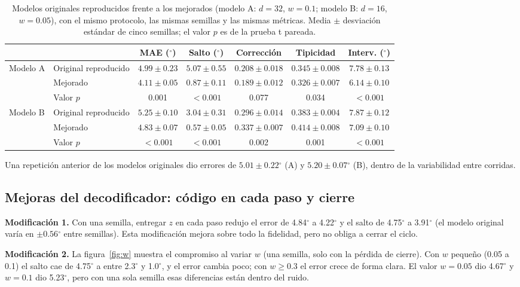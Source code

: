 \documentclass[11pt,a4paper]{amsart}
\newcommand{\gr}{$^{\circ}$}
\begin{document}
\begin{table}[h]
\centering\small
\setlength{\tabcolsep}{3pt}
\begin{tabular}{llccccc}
\toprule
 & & MAE (\gr) & Salto (\gr) & Corrección & Tipicidad & Interv. (\gr) \\
\midrule
\multirow{3}{*}{Modelo A} & Original reproducido & $4.99\pm0.23$ & $5.07\pm0.55$ & $0.208\pm0.018$ & $0.345\pm0.008$ & $7.78\pm0.13$ \\
 & Mejorado & $4.11\pm0.05$ & $0.87\pm0.11$ & $0.189\pm0.012$ & $0.326\pm0.007$ & $6.14\pm0.10$ \\
 & Valor $p$ & 0.001 & $<0.001$ & 0.077 & 0.034 & $<0.001$ \\
\midrule
\multirow{3}{*}{Modelo B} & Original reproducido & $5.25\pm0.10$ & $3.04\pm0.31$ & $0.296\pm0.014$ & $0.383\pm0.004$ & $7.87\pm0.12$ \\
 & Mejorado & $4.83\pm0.07$ & $0.57\pm0.05$ & $0.337\pm0.007$ & $0.414\pm0.008$ & $7.09\pm0.10$ \\
 & Valor $p$ & $<0.001$ & $<0.001$ & 0.002 & 0.001 & $<0.001$ \\
\bottomrule
\end{tabular}
\caption{Modelos originales reproducidos frente a los mejorados (modelo A: $d=32$, $w=0.1$; modelo B: $d=16$, $w=0.05$), con el mismo protocolo, las mismas semillas y las mismas métricas. Media $\pm$ desviación estándar de cinco semillas; el valor $p$ es de la prueba t pareada.}
\label{tab:origrep}
\end{table}

Una repetición anterior de los modelos originales dio errores de $5.01\pm0.22$\gr{} (A) y $5.20\pm0.07$\gr{} (B), dentro de la variabilidad entre corridas.

\subsection{Mejoras del decodificador: código en cada paso y cierre}
\label{sec:res_mejoras}

\textbf{Modificación 1.} Con una semilla, entregar $z$ en cada paso redujo el error de 4.84\gr{} a 4.22\gr{} y el salto de 4.75\gr{} a 3.91\gr{} (el modelo original varía en $\pm0.56$\gr{} entre semillas). Esta modificación mejora sobre todo la fidelidad, pero no obliga a cerrar el ciclo.

\textbf{Modificación 2.} La figura~\ref{fig:w} muestra el compromiso al variar $w$ (una semilla, solo con la pérdida de cierre). Con $w$ pequeño (0.05 a 0.1) el salto cae de 4.75\gr{} a entre 2.3\gr{} y 1.0\gr{}, y el error cambia poco; con $w\ge0.3$ el error crece de forma clara. El valor $w=0.05$ dio 4.67\gr{} y $w=0.1$ dio 5.23\gr{}, pero con una sola semilla esas diferencias están dentro del ruido.
\end{document}
